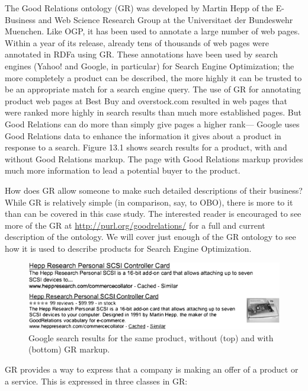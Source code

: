 The Good Relations ontology (GR) was developed by Martin Hepp of the
E-Business and Web Science Research Group at the Universitaet der
Bundeswehr Muenchen. Like OGP, it has been used to annotate a large
number of web pages. Within a year of its release, already tens of
thousands of web pages were annotated in RDFa using GR. These
annotations have been used by search engines (Yahoo! and Google, in
particular) for Search Engine Optimization; the more completely a
product can be described, the more highly it can be trusted to be an
appropriate match for a search engine query. The use of GR for
annotating product web pages at Best Buy and overstock.com resulted in
web pages that were ranked more highly in search results than much more
established pages. But Good Relations can do more than simply give pages
a higher rank--- Google uses Good Relations data to enhance the
information it gives about a product in response to a search. Figure
13.1 shows search results for a product, with and without Good Relations
markup. The page with Good Relations markup provides much more
information to lead a potential buyer to the product.

How does GR allow someone to make such detailed descriptions of their
business? While GR is relatively simple (in comparison, say, to OBO),
there is more to it than can be covered in this case study. The
interested reader is encouraged to see more of the GR at
\href{http://purl.org/goodrelations/}{{http://purl.org/goodrelations/}}
for a full and current description of the ontology. We will cover just
enough of the GR ontology to see how it is used to describe products for
Search Engine Optimization.

\begin{figure}
\centering
\includegraphics[width=5in]{media/ch14/f14-01.png}
\caption{Google search results for the same product, without (top) and with
(bottom) GR markup.}
\label{fig:ch14.01}
\end{figure}




GR provides a way to express that a company is making an offer of a
product or a service. This is expressed in three classes in GR:

